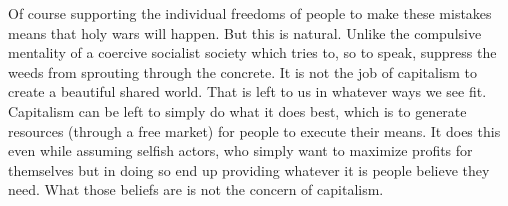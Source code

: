Of course supporting the individual freedoms of people to make these mistakes means that holy wars will happen. But this is natural. Unlike the compulsive mentality of a coercive socialist society which tries to, so to speak, suppress the weeds from sprouting through the concrete. It is not the job of capitalism to create a beautiful shared world. That is left to us in whatever ways we see fit. Capitalism can be left to simply do what it does best, which is to generate resources (through a free market) for people to execute their means. It does this even while assuming selfish actors, who simply want to maximize profits for themselves but in doing so end up providing whatever it is people believe they need. What those beliefs are is not the concern of capitalism.
